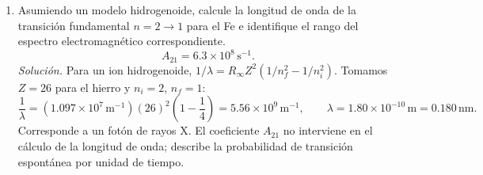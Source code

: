 \documentclass[11pt]{article}
\begin{document}
\begin{enumerate}
    \textit{Solución.} La probabilidad radial entre $r_1$ y $r_2$ es $\int_{r_1}^{r_2}r^2|R_{n\ell}(r)|^2\,dr$. Para $n=2$, las funciones radiales normalizadas son
    \[
        R_{20}(r)=\frac{1}{2\sqrt{2}\,a_0^{3/2}}\left(2-\frac{r}{a_0}\right)e^{-r/(2a_0)},
        \qquad
        R_{21}(r)=\frac{1}{2\sqrt{6}\,a_0^{3/2}}\frac{r}{a_0}e^{-r/(2a_0)}.
    \]
    Con $u=r/a_0$, para los dos estados se obtiene
    \[
        P_{2s}(0\leq r\leq a_0)=\frac18\int_0^1u^2(2-u)^2e^{-u}\,du
        =1-\frac{21}{8e}\simeq0.0343,
    \]
    \[
        P_{2p}(0\leq r\leq a_0)=\frac1{24}\int_0^1u^4e^{-u}\,du
        =1-\frac{65}{24e}\simeq0.00366.
    \]
    Por tanto, dentro de $a_0$ la probabilidad para $\ell=0$ es aproximadamente $9.38$ veces la de $\ell=1$. \parencite[Sec. 20.4, pp. 675--676; Sec. 20.5, pp. 679--680]{chaparro2026}
    

    \item Asumiendo un modelo hidrogenoide, calcule la longitud de onda de la transición fundamental $n = 2 \to 1$ para el Fe e identifique el rango del espectro electromagnético correspondiente.
    \[
        A_{21} = 6.3 \times 10^8\,\mathrm{s}^{-1}.
    \]
    \textit{Solución.} Para un ion hidrogenoide, $1/\lambda=R_\infty Z^2(1/n_f^2-1/n_i^2)$. Tomamos $Z=26$ para el hierro y $n_i=2$, $n_f=1$:
    \[
        \frac{1}{\lambda}= (1.097\times10^7\,\mathrm{m}^{-1})(26)^2\left(1-\frac14\right)
        =5.56\times10^9\,\mathrm{m}^{-1},
        \qquad \lambda=1.80\times10^{-10}\,\mathrm{m}=0.180\,\mathrm{nm}.
    \]
    Corresponde a un fotón de rayos X. El coeficiente $A_{21}$ no interviene en el cálculo de la longitud de onda; describe la probabilidad de transición espontánea por unidad de tiempo. \parencite[Sec. 15.5, p. 496; Sec. 20.4, pp. 675--676]{chaparro2026}
    
\end{enumerate}

\printbibliography[title={Referencias}]
\end{document}
